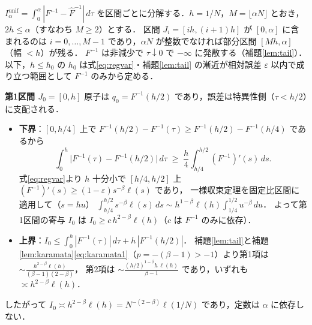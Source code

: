 \documentclass[a4paper,10pt]{jsarticle}
\makeatletter
\theoremstyle{definition}
\renewenvironment{proof}[1][\proofname]{\par
  \pushQED{\qed}%
  \normalfont \topsep6\p@\@plus6\p@\relax
  \trivlist
  \item[\hskip\labelsep\textbf{#1}]\ignorespaces
}{%
  \popQED\endtrivlist\@endpefalse
}
\renewcommand{\proofname}{証明}
\newcommand{\Finv}{F^{-1}}
\newcommand{\Fhinv}{\hat{F}^{-1}}
\newcommand{\Iunif}{I_\alpha^{\mathrm{unif}}}
\makeatother
\begin{document}
\begin{proof}
$\Iunif=\int_0^\alpha|\Finv-\Fhinv|\,d\tau$ を区間ごとに分解する．$h=1/N$，$M=\lfloor\alpha N\rfloor$ とおき，$2h\le\alpha$（すなわち $M\ge2$）とする．
区間 $J_i=[ih,(i+1)h]$ が $[0,\alpha]$ に含まれるのは $i=0,\dots,M-1$ であり，$\alpha N$ が整数でなければ部分区間 $[Mh,\alpha]$（幅 $<h$）が残る．
$\Finv$ は非減少で $\tau\downarrow0$ で $-\infty$ に発散する（補題\ref{lem:tail}）．
以下，$h\le h_0$ の $h_0$ は式\eqref{eq:regvar}・補題\ref{lem:tail} の漸近が相対誤差 $\varepsilon$ 以内で成り立つ範囲として $\Finv$ のみから定める．

\noindent\textbf{第1区間 $J_0=[0,h]$}
原子は $q_0=\Finv(h/2)$ であり，誤差は特異性側（$\tau<h/2$）に支配される．
\begin{itemize}
\item \textbf{下界}：$[0,h/4]$ 上で $\Finv(h/2)-\Finv(\tau)\ge\Finv(h/2)-\Finv(h/4)$ であるから
\begin{equation*}
\int_0^{h}\bigl|\Finv(\tau)-\Finv(h/2)\bigr|\,d\tau
\;\ge\;\frac{h}{4}\int_{h/4}^{h/2}(\Finv)'(s)\,ds .
\end{equation*}
式\eqref{eq:regvar}より $h$ 十分小で $[h/4,h/2]$ 上 $(\Finv)'(s)\ge(1-\varepsilon)s^{-\beta}\ell(s)$ であり，
一様収束定理を固定比区間に適用して（$s=hu$）
$\int_{h/4}^{h/2}s^{-\beta}\ell(s)\,ds\sim h^{1-\beta}\ell(h)\int_{1/4}^{1/2}u^{-\beta}\,du$．
よって第1区間の寄与 $I_0$ は $I_0\ge c\,h^{2-\beta}\ell(h)$（$c$ は $\Finv$ のみに依存）．
\item \textbf{上界}：$I_0\le\int_0^h|\Finv(\tau)|\,d\tau+h\,|\Finv(h/2)|$．
補題\ref{lem:tail}と補題\ref{lem:karamata}\eqref{eq:karamata1}（$p=-(\beta-1)>-1$）より第1項は $\sim\frac{h^{2-\beta}\ell(h)}{(\beta-1)(2-\beta)}$，
第2項は $\sim\frac{(h/2)^{1-\beta}h\,\ell(h)}{\beta-1}$ であり，いずれも $\asymp h^{2-\beta}\ell(h)$．
\end{itemize}
したがって $I_0\asymp h^{2-\beta}\ell(h)=N^{-(2-\beta)}\ell(1/N)$ であり，定数は $\alpha$ に依存しない．


\end{proof}
\end{document}

